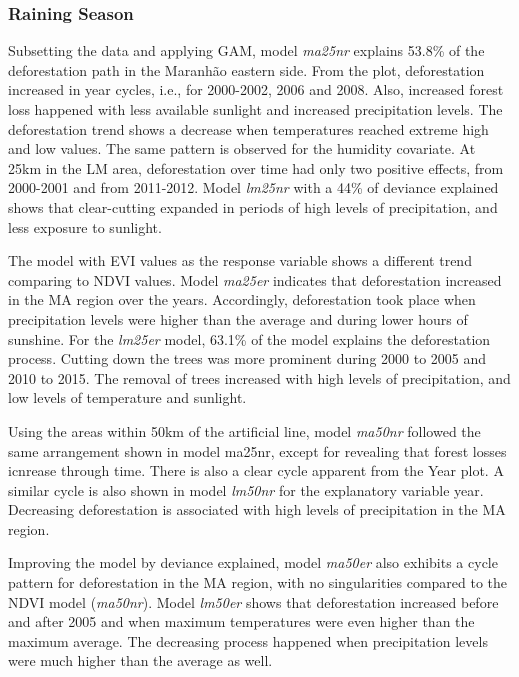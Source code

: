 \subsubsection{Raining Season}
Subsetting the data and applying GAM, model \textit{ma25nr} explains 53.8\% of the deforestation path in the Maranhão eastern side. From the plot, deforestation increased in year cycles, i.e., for 2000-2002, 2006 and 2008. Also, increased forest loss happened with less available sunlight and increased precipitation levels. The deforestation trend shows a decrease when temperatures reached extreme high and low values. The same pattern is observed for the humidity covariate. At 25km in the LM area, deforestation over time had only two positive effects, from 2000-2001 and from 2011-2012. Model \textit{lm25nr} with a 44\% of deviance explained shows that clear-cutting expanded in periods of high levels of precipitation, and less exposure to sunlight. 

The model with EVI values as the response variable shows a different trend comparing to NDVI values. Model \textit{ma25er} indicates that deforestation increased in the MA region over the years. Accordingly, deforestation took place when precipitation levels were higher than the average and during lower hours of sunshine. For the \textit{lm25er} model, 63.1\% of the model explains the deforestation process. Cutting down the trees was more prominent during 2000 to 2005 and 2010 to 2015. The removal of trees increased with high levels of precipitation, and low levels of temperature and sunlight. 

Using the areas within 50km of the artificial line, model \textit{ma50nr} followed the same arrangement shown in model ma25nr, except for revealing that forest losses icnrease through time. There is also a clear cycle apparent from the Year plot. A similar cycle is also shown in model \textit{lm50nr} for the explanatory variable year. Decreasing deforestation is associated with high levels of precipitation in the MA region. 

Improving the model by deviance explained, model \textit{ma50er} also exhibits a cycle pattern for deforestation in the MA region, with no singularities compared to the NDVI model (\textit{ma50nr}). Model \textit{lm50er} shows that deforestation increased before and after 2005 and when maximum temperatures were even higher than the maximum average. The decreasing process happened when precipitation levels were much higher than the average as well. 

